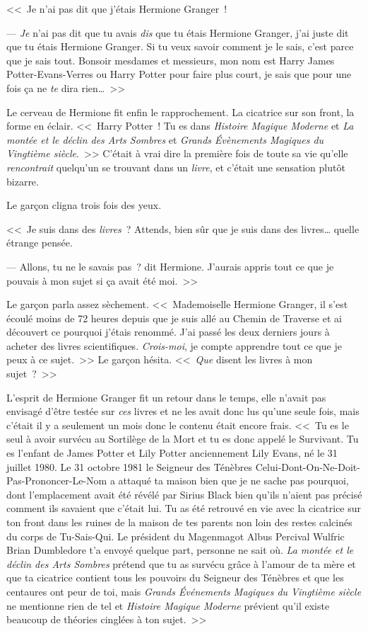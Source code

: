 <<~Je n'ai pas dit que j'étais Hermione Granger~!

--- \emph{Je} n'ai pas dit que tu avais \emph{dis} que tu étais Hermione Granger, j'ai juste dit que tu étais Hermione Granger. Si tu veux savoir comment je le sais, c'est parce que je sais tout. Bonsoir mesdames et messieurs, mon nom est Harry James Potter-Evans-Verres ou Harry Potter pour faire plus court, je sais que pour une fois ça ne \emph{te} dira rien…~>>

Le cerveau de Hermione fit enfin le rapprochement. La cicatrice sur son front, la forme en éclair. <<~Harry Potter~! Tu es dans \emph{Histoire Magique Moderne} et \emph{La montée et le déclin des Arts Sombres} et \emph{Grands Évènements Magiques du Vingtième siècle}.~>> C'était à vrai dire la première fois de toute sa vie qu'elle \emph{rencontrait} quelqu'un se trouvant dans un \emph{livre}, et c'était une sensation plutôt bizarre.

Le garçon cligna trois fois des yeux.

<<~Je suis dans des \emph{livres}~? Attends, bien sûr que je suis dans des livres… quelle étrange pensée.

--- Allons, tu ne le savais pas~? dit Hermione. J'aurais appris tout ce que je pouvais à mon sujet si ça avait été moi.~>>

Le garçon parla assez sèchement. <<~Mademoiselle Hermione Granger, il s'est écoulé moins de 72 heures depuis que je suis allé au Chemin de Traverse et ai découvert ce pourquoi j'étais renommé. J'ai passé les deux derniers jours à acheter des livres scientifiques. \emph{Crois-moi}, je compte apprendre tout ce que je peux à ce sujet.~>> Le garçon hésita. <<~\emph{Que} disent les livres à mon sujet~?~>>

L'esprit de Hermione Granger fit un retour dans le temps, elle n'avait pas envisagé d'être testée sur \emph{ces} livres et ne les avait donc lus qu'une seule fois, mais c'était il y a seulement un mois donc le contenu était encore frais. <<~Tu es le seul à avoir survécu au Sortilège de la Mort et tu es donc appelé le Survivant. Tu es l'enfant de James Potter et Lily Potter anciennement Lily Evans, né le 31 juillet 1980. Le 31 octobre 1981 le Seigneur des Ténèbres Celui-Dont-On-Ne-Doit-Pas-Prononcer-Le-Nom a attaqué ta maison bien que je ne sache pas pourquoi, dont l'emplacement avait été révélé par Sirius Black bien qu'ils n'aient pas précisé comment ils savaient que c'était lui. Tu as été retrouvé en vie avec la cicatrice sur ton front dans les ruines de la maison de tes parents non loin des restes calcinés du corps de Tu-Sais-Qui. Le président du Magenmagot Albus Percival Wulfric Brian Dumbledore t'a envoyé quelque part, personne ne sait où. \emph{La montée et le déclin des Arts Sombres} prétend que tu as survécu grâce à l'amour de ta mère et que ta cicatrice contient tous les pouvoirs du Seigneur des Ténèbres et que les centaures ont peur de toi, mais \emph{Grands Événements Magiques du Vingtième siècle} ne mentionne rien de tel et \emph{Histoire Magique Moderne} prévient qu'il existe beaucoup de théories cinglées à ton sujet.~>>

